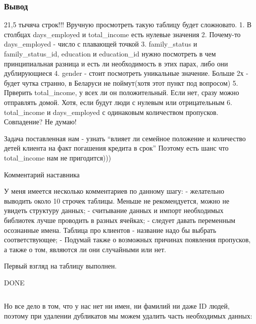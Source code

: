 \documentclass[11pt]{article}
\newcommand{\prompt}[4]{
        \llap{{\color{#2}[#3]: #4}}\vspace{-1.25em}
    }
\begin{document}
    \hypertarget{ux432ux44bux432ux43eux434}{%
\subsubsection{Вывод}\label{ux432ux44bux432ux43eux434}}

    21,5 тычяча строк!!! Вручную просмотреть такую таблицу будет сложновато.
1. В столбцах days\_employed и total\_income есть нулевые значения 2.
Почему-то days\_employed - число с плавающей точкой 3. family\_status и
family\_status\_id, education и education\_id нужно посмотреть в чем
принципиальная разница и есть ли необходимость в этих парах, либо они
дублирующиеся 4. gender - стоит посмотреть уникальные значение. Больше
2х - будет чутка странно, в Беларуси не поймут(хотя этот пункт под
вопросом) 5. Прверить total\_income, у всех ли он положительный. Если
нет, сразу можно отправлять домой. Хотя, если будут люди с нулевым или
отрицательным 6. total\_income и days\_employed с одинаковым количеством
пропусков. Совпадение? Не думаю!

Задача поставленная нам - узнать ``влияет ли семейное положение и
количество детей клиента на факт погашения кредита в срок'' Поэтому есть
шанс что total\_income нам не пригодится)))

    Комментарий наставника

У меня имеется несколько комментариев по данному шагу: - желательно
выводить около 10 строчек таблицы. Меньше не рекомендуется, можно не
увидеть структуру данных; - считывание данных и импорт необходимых
библиотек лучше проводить в разных ячейках; - следует давать переменным
осознанные имена. Таблица про клиентов - название надо бы выбрать
соответствующее; - Подумай также о возможных причинах появления
пропусков, а также о том, являются ли они случайными или нет.

Первый взгляд на таблицу выполнен.

    DONE

    \begin{tcolorbox}[breakable, size=fbox, boxrule=1pt, pad at break*=1mm,colback=cellbackground, colframe=cellborder]
\prompt{In}{incolor}{ }{\hspace{4pt}}
\begin{Verbatim}[commandchars=\\\{\}]

\end{Verbatim}
\end{tcolorbox}

    Но все дело в том, что у нас нет ни имен, ни фамилий ни даже ID людей,
поэтому при удалении дубликатов мы можем удалить часть необходимых
данных:
\end{document}
